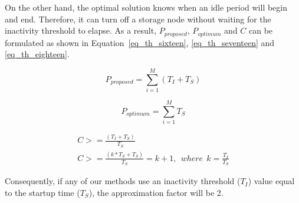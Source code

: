 On the other hand, the optimal solution knows when an idle period will begin and
end. Therefore, it can turn off a storage node without waiting for the inactivity
threshold to elapse. As a result, $P_{proposed}$, $P_{optimum}$ and $C$ can be
formulated as shown in Equation~\eqref{eq_th_sixteen}, \eqref{eq_th_seventeen}
and \eqref{eq_th_eighteen}.

\begin{equation}
P_{proposed} = \sum\limits_{i=1}^{M} (T_{I} + T_{S})
\label{eq_th_sixteen}
\end{equation}
\hfill

\begin{equation}
P_{optimum} = \sum\limits_{i=1}^{M} T_{S}
\label{eq_th_seventeen}
\end{equation}
\hfill

\begin{equation}
\begin{gathered}
C >= \frac{(T_{I} + T_{S})}{T_{S}} \\
C >= \frac{(k * T_{S} + T_{S})}{T_{S}} = k + 1,\ \ where\ \ k = \frac{T_{I}}{T_{S}}
\label{eq_th_eighteen}
\end{gathered}
\end{equation}
\hfill

Consequently, if any of our methods use an inactivity threshold ($T_{I}$) value
equal to the startup time ($T_{S}$), the approximation factor will be 2.

